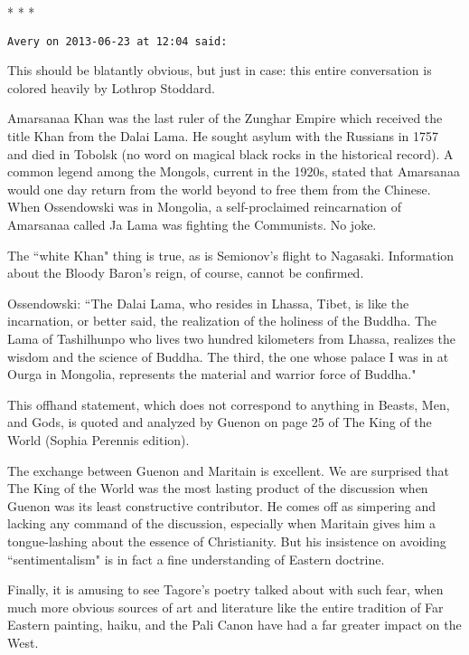
\begin{center}* * *\end{center}

\begin{footnotesize}\begin{sffamily}



\texttt{Avery on 2013-06-23 at 12:04 said: }

This should be blatantly obvious, but just in case: this entire conversation is colored heavily by Lothrop Stoddard.

Amarsanaa Khan was the last ruler of the Zunghar Empire which received the title Khan from the Dalai Lama. He sought asylum with the Russians in 1757 and died in Tobolsk (no word on magical black rocks in the historical record). A common legend among the Mongols, current in the 1920s, stated that Amarsanaa would one day return from the world beyond to free them from the Chinese. When Ossendowski was in Mongolia, a self-proclaimed reincarnation of Amarsanaa called Ja Lama was fighting the Communists. No joke. 

The ``white Khan" thing is true, as is Semionov's flight to Nagasaki. Information about the Bloody Baron's reign, of course, cannot be confirmed.

Ossendowski: ``The Dalai Lama, who resides in Lhassa, Tibet, is like the incarnation, or better said, the realization of the holiness of the Buddha. The Lama of Tashilhunpo who lives two hundred kilometers from Lhassa, realizes the wisdom and the science of Buddha. The third, the one whose palace I was in at Ourga in Mongolia, represents the material and warrior force of Buddha."

This offhand statement, which does not correspond to anything in Beasts, Men, and Gods, is quoted and analyzed by Guenon on page 25 of The King of the World (Sophia Perennis edition).

The exchange between Guenon and Maritain is excellent. We are surprised that The King of the World was the most lasting product of the discussion when Guenon was its least constructive contributor. He comes off as simpering and lacking any command of the discussion, especially when Maritain gives him a tongue-lashing about the essence of Christianity. But his insistence on avoiding ``sentimentalism" is in fact a fine understanding of Eastern doctrine. 

Finally, it is amusing to see Tagore's poetry talked about with such fear, when much more obvious sources of art and literature like the entire tradition of Far Eastern painting, haiku, and the Pali Canon have had a far greater impact on the West.



\end{sffamily}
\end{footnotesize}
